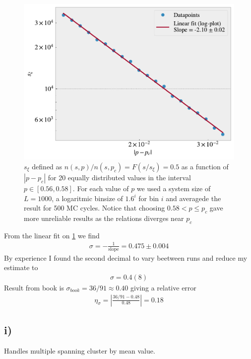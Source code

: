 \documentclass[reprint, amsmath, amssymb, aps]{revtex4-2}
\begin{document}
\begin{figure}[H]
  \includegraphics[width=\linewidth]{figures/h_sigma.pdf}
  \caption{$s_{\xi}$ defined as $n(s,p)/n(s,p_c) = F(s/s_{\xi}) = 0.5$ as a function of $|p-p_c|$ for 20 equally distributed values in the interval $p \in [0.56, 0.58]$. For each value of $p$ we used a system size of $L = 1000$, a logaritmic binsize of $1.6^i$ for bin $i$ and averagede the result for 500 MC cycles. Notice that choosing $0.58 < p \le p_c$ gave more unreliable results as the relations diverges near $p_c$}
  \label{fig:h}
\end{figure}
From the linear fit on \ref{fig:h} we find
\begin{align*}
  \sigma = -\frac{1}{\text{slope}} =  0.475 \pm 0.004
\end{align*}
By experience I found the second decimal to vary beetween runs and reduce my estimate to
\begin{align*}
  \sigma = 0.4(8)
\end{align*}
Result from book is $\sigma_{book} = 36/91 \approx 0.40$ giving a relative error
\begin{align*}
  \eta_\sigma = \left|\frac{36/91 - 0.48}{0.48}\right| = 0.18
\end{align*}

\subsection*{i)}
Handles multiple spanning cluster by mean value.
\end{document}

